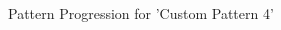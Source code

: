 \begin{figure}[H]
{\begin{adjustbox}{height=5cm,center}
\begin{tabular}{ll}
          \end{tabular}
        \end{adjustbox}
      }\caption{Pattern Progression for 'Custom Pattern 4'}
    \end{figure}
    
